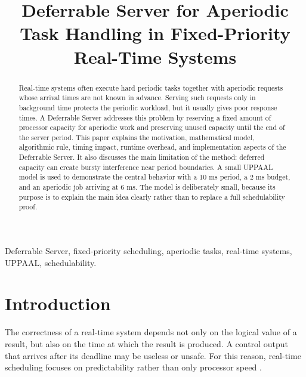 \documentclass[conference]{IEEEtran}
\begin{document}
	
	\title{Deferrable Server for Aperiodic Task Handling in Fixed-Priority Real-Time Systems}
	
	\author{
	}
	
	\maketitle
	
	\begin{abstract}
		Real-time systems often execute hard periodic tasks together with aperiodic requests whose arrival times are not known in advance. Serving such requests only in background time protects the periodic workload, but it usually gives poor response times. A Deferrable Server addresses this problem by reserving a fixed amount of processor capacity for aperiodic work and preserving unused capacity until the end of the server period. This paper explains the motivation, mathematical model, algorithmic rule, timing impact, runtime overhead, and implementation aspects of the Deferrable Server. It also discusses the main limitation of the method: deferred capacity can create bursty interference near period boundaries. A small UPPAAL model is used to demonstrate the central behavior with a 10 ms period, a 2 ms budget, and an aperiodic job arriving at 6 ms. The model is deliberately small, because its purpose is to explain the main idea clearly rather than to replace a full schedulability proof.
	\end{abstract}
	
	\begin{IEEEkeywords}
		Deferrable Server, fixed-priority scheduling, aperiodic tasks, real-time systems, UPPAAL, schedulability.
	\end{IEEEkeywords}
	
	\section{Introduction}
	
	The correctness of a real-time system depends not only on the logical value of a result, but also on the time at which the result is produced. A control output that arrives after its deadline may be useless or unsafe. For this reason, real-time scheduling focuses on predictability rather than only processor speed \cite{buttazzo2011}.
	
\end{document}

